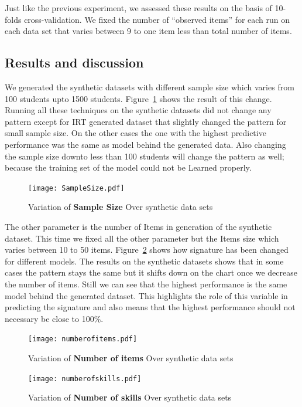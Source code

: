 Just like the previous experiment, we assessed these results on the basis of 10-folds cross-validation. We fixed the number of ``observed items'' for each run on each data set that varies between 9 to one item less than total number of items.

\subsection{Results and discussion}

We generated the synthetic datasets with different sample size which varies from 100 students upto 1500 students. Figure~\ref{figSampleSize} shows the result of this change. Running all these techniques on the synthetic datasets did not change any pattern except for IRT generated dataset that slightly changed the pattern for small sample size. On the other cases the one with the highest predictive performance was the same as model behind the generated data. Also changing the sample size downto less than 100 students will change the pattern as well; because the training set of the model could not be Learned properly.

\begin{figure}
  \centering

    \texttt{[image: SampleSize.pdf]}
     \caption{Variation of \textbf{Sample Size} Over synthetic data sets}
\label{figSampleSize}
\end{figure}


The other parameter is the number of Items in generation of the synthetic dataset. This time we fixed all the other parameter but the Items size which varies between 10 to 50 items. Figure~\ref{figNumberofItems} shows how signature has been changed for different models. The results on the synthetic datasets shows that in some cases the pattern stays the same but it shifts down on the chart once we decrease the number of items. Still we can see that the highest performance is the same model behind the generated dataset. This highlights the role of this variable in predicting the signature and also means that the highest performance should not necessary be close to 100\%.

\begin{figure}
  \centering
    \texttt{[image: numberofitems.pdf]}
\caption{Variation of \textbf{Number of items} Over synthetic data sets}
\label{figNumberofItems}
\end{figure}

\begin{figure}
  \centering
    \texttt{[image: numberofskills.pdf]}
\caption{Variation of \textbf{Number of skills} Over synthetic data sets}
\label{figSkills}
\end{figure}

